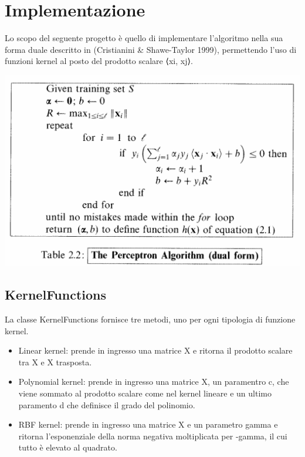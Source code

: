 \documentclass{article}
\begin{document}
	\section{Implementazione} 
	Lo scopo del seguente progetto è quello di implementare l'algoritmo nella sua forma duale descritto in (Cristianini \& Shawe-Taylor 1999), permettendo l'uso di funzioni kernel al posto del prodotto
	scalare ⟨xi, xj⟩.
	\begin{center}
		\includegraphics[width=0.7\linewidth]{pseudocodice_perceptron.png}
		\label{The Perceptron Algorithm (dual form)}
	\end{center}
	\subsection{KernelFunctions}
	La classe KernelFunctions fornisce tre metodi, uno per ogni tipologia di funzione kernel. 
	\begin{itemize}
		\item Linear kernel: prende in ingresso una matrice X e ritorna il prodotto scalare tra X e X trasposta.
		\item Polynomial kernel: prende in ingresso una matrice X, un paramentro c, che viene sommato al prodotto scalare come nel kernel lineare e un ultimo paramento d che definisce il grado del polinomio. 
		\item RBF kernel: prende in ingresso una matrice X e un parametro gamma e ritorna l'esponenziale della norma negativa moltiplicata per -gamma, il cui tutto è elevato al quadrato.
	\end{itemize}
\end{document}
